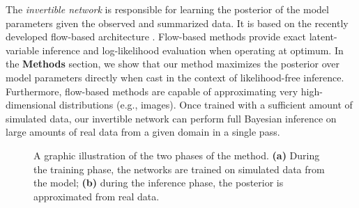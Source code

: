 \documentclass[9pt,twoside,lineno]{pnas-new}
\begin{document}
The \textit{invertible network} is responsible for learning the posterior of the model parameters given the observed and summarized data. It is based on the recently developed flow-based architecture \cite{kingma2018glow, grover2018flow, dinh2016density}. Flow-based methods provide exact latent-variable inference and log-likelihood evaluation when operating at optimum. In the \textbf{Methods} section, we show that our method maximizes the posterior over model parameters directly when cast in the context of likelihood-free inference. Furthermore, flow-based methods are capable of approximating very high-dimensional distributions (e.g., images). Once trained with a sufficient amount of simulated data, our invertible network can perform full Bayesian inference on large amounts of real data from a given domain in a single pass. 

\begin{figure}
    \centering
    \newline
    \caption{A graphic illustration of the two phases of the method. \textbf{(a)} During the training phase, the networks are trained on simulated data from the model; \textbf{(b)} during the inference phase, the posterior is approximated from real data.}
    \label{fig:first}
\end{figure}
\end{document}
